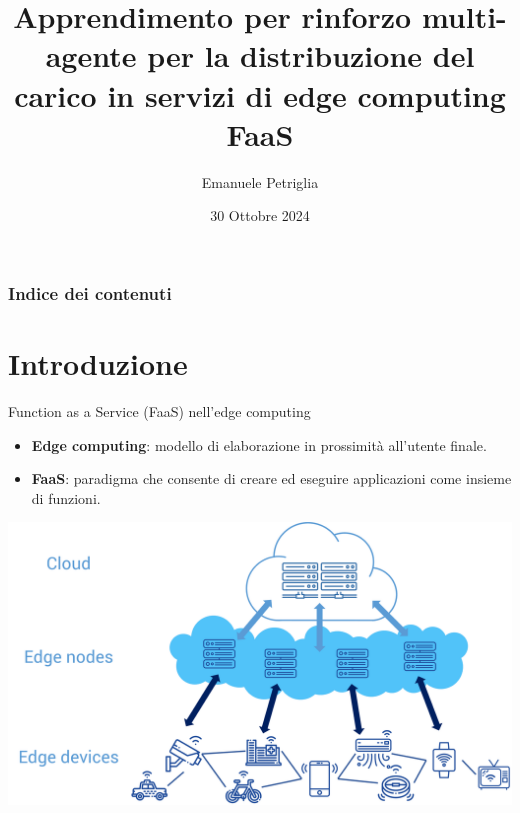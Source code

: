 \documentclass[]{beamer}
\title{Apprendimento per rinforzo multi-agente per la distribuzione del carico in servizi di edge computing FaaS}
\date{30 Ottobre 2024}
\author[]{Emanuele Petriglia}
\begin{document}
\begin{frame}[plain]
    \titlepage
\end{frame}

\begin{frame}[plain]
    \frametitle{Indice dei contenuti}
    \tableofcontents[hideallsubsections]
\end{frame}

\section{Introduzione}

\begin{frame}{Function as a Service (FaaS) nell'edge computing}
    \begin{itemize}
        \item \textbf{Edge computing}: modello di elaborazione in prossimità all'utente finale.

        \medskip

        \item \textbf{FaaS}: paradigma che consente di creare ed eseguire applicazioni come insieme di funzioni.
    \end{itemize}

    \centering
     \includegraphics[width=.7\textwidth]{assets/slides/edge_computing.png}
\end{frame}
\end{document}
